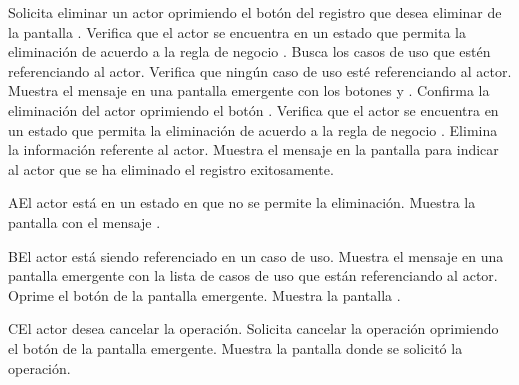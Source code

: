  \begin{UCtrayectoria}
    \UCpaso[\UCactor] Solicita eliminar un actor oprimiendo el botón \btnEliminar del registro que desea eliminar de la pantalla .
    \UCpaso[\UCsist] Verifica que el actor se encuentra en un estado que permita la eliminación de acuerdo a la regla de negocio . 
    \UCpaso[\UCsist] Busca los casos de uso que estén referenciando al actor.
    \UCpaso[\UCsist] Verifica que ningún caso de uso esté referenciando al actor. 
    \UCpaso[\UCsist] Muestra el mensaje  en una pantalla emergente con los botones  y .
    \UCpaso[\UCactor] Confirma la eliminación del actor oprimiendo el botón . 
    \UCpaso[\UCsist] Verifica que el actor se encuentra en un estado que permita la eliminación de acuerdo a la regla de negocio . 
    \UCpaso[\UCsist] Elimina la información referente al actor.
    \UCpaso[\UCsist] Muestra el mensaje  en la pantalla 
    para indicar al actor que se ha eliminado el registro exitosamente.
 \end{UCtrayectoria}
 
 \begin{UCtrayectoriaA}{A}{El actor está en un estado en que no se permite la eliminación.}
    \UCpaso[\UCsist] Muestra la pantalla  con el mensaje .
 \end{UCtrayectoriaA} 
 \begin{UCtrayectoriaA}{B}{El actor está siendo referenciado en un caso de uso.}
    \UCpaso[\UCsist] Muestra el mensaje  en una pantalla emergente
    con la lista de casos de uso que están referenciando al actor.
    \UCpaso[\UCactor] Oprime el botón  de la pantalla emergente.
    \UCpaso[\UCsist] Muestra la pantalla .
 \end{UCtrayectoriaA}
 \begin{UCtrayectoriaA}{C}{El actor desea cancelar la operación.}
    \UCpaso[\UCactor] Solicita cancelar la operación oprimiendo el botón  de la pantalla emergente.
    \UCpaso[\UCsist] Muestra la pantalla donde se solicitó la operación.
 \end{UCtrayectoriaA} 